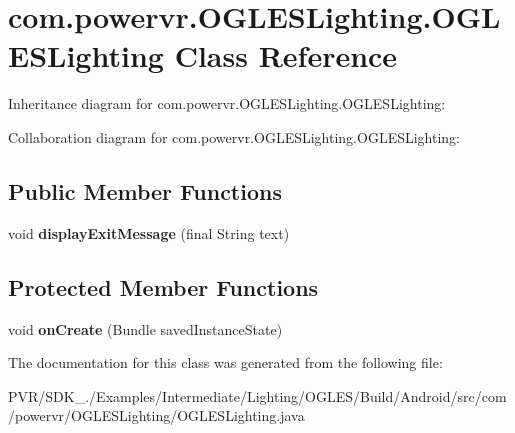 \hypertarget{classcom_1_1powervr_1_1_o_g_l_e_s_lighting_1_1_o_g_l_e_s_lighting}{\section{com.\+powervr.\+O\+G\+L\+E\+S\+Lighting.\+O\+G\+L\+E\+S\+Lighting Class Reference}
\label{classcom_1_1powervr_1_1_o_g_l_e_s_lighting_1_1_o_g_l_e_s_lighting}
}


Inheritance diagram for com.\+powervr.\+O\+G\+L\+E\+S\+Lighting.\+O\+G\+L\+E\+S\+Lighting\+:


Collaboration diagram for com.\+powervr.\+O\+G\+L\+E\+S\+Lighting.\+O\+G\+L\+E\+S\+Lighting\+:
\subsection*{Public Member Functions}
\begin{DoxyCompactItemize}
\item 
\hypertarget{classcom_1_1powervr_1_1_o_g_l_e_s_lighting_1_1_o_g_l_e_s_lighting_a6262ea2e8333d393bb4710a219bb5623}{void {\bfseries display\+Exit\+Message} (final String text)}\label{classcom_1_1powervr_1_1_o_g_l_e_s_lighting_1_1_o_g_l_e_s_lighting_a6262ea2e8333d393bb4710a219bb5623}

\end{DoxyCompactItemize}
\subsection*{Protected Member Functions}
\begin{DoxyCompactItemize}
\item 
\hypertarget{classcom_1_1powervr_1_1_o_g_l_e_s_lighting_1_1_o_g_l_e_s_lighting_a8a285f627f5deaec89af38dcf9127616}{void {\bfseries on\+Create} (Bundle saved\+Instance\+State)}\label{classcom_1_1powervr_1_1_o_g_l_e_s_lighting_1_1_o_g_l_e_s_lighting_a8a285f627f5deaec89af38dcf9127616}

\end{DoxyCompactItemize}


The documentation for this class was generated from the following file\+:\begin{DoxyCompactItemize}
\item 
P\+V\+R/\+S\+D\+K\+\_./\+Examples/\+Intermediate/\+Lighting/\+O\+G\+L\+E\+S/\+Build/\+Android/src/com/powervr/\+O\+G\+L\+E\+S\+Lighting/O\+G\+L\+E\+S\+Lighting.\+java\end{DoxyCompactItemize}
